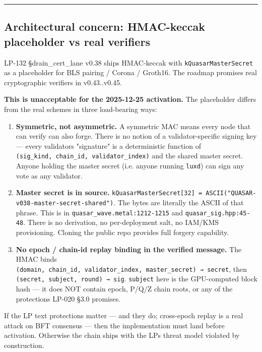 \documentclass[
]{article}
\providecommand{\tightlist}{%
  \setlength{\itemsep}{0pt}\setlength{\parskip}{0pt}}
\begin{document}
\begin{center}\rule{0.5\linewidth}{0.5pt}\end{center}

\subsection{Architectural concern: HMAC-keccak placeholder vs real
verifiers}\label{architectural-concern-hmac-keccak-placeholder-vs-real-verifiers}

LP-132 §drain\_cert\_lane v0.38 ships HMAC-keccak with
\texttt{kQuasarMasterSecret} as a placeholder for BLS pairing / Corona
/ Groth16. The roadmap promises real cryptographic verifiers in
v0.43..v0.45.

\textbf{This is unacceptable for the 2025-12-25 activation.} The
placeholder differs from the real schemes in three load-bearing ways:

\begin{enumerate}
\def\labelenumi{\arabic{enumi}.}
\tightlist
\item
  \textbf{Symmetric, not asymmetric.} A symmetric MAC means every node
  that can verify can also forge. There is no notion of a
  validator-specific signing key --- every validator\textquotesingle s
  "signature" is a deterministic function of
  \texttt{(sig\_kind,\ chain\_id,\ validator\_index)} and the shared
  master secret. Anyone holding the master secret (i.e. anyone running
  \texttt{luxd}) can sign any vote as any validator.
\item
  \textbf{Master secret is in source.}
  \texttt{kQuasarMasterSecret{[}32{]}\ =\ ASCII("QUASAR-v038-master-secret-shared")}.
  The bytes are literally the ASCII of that phrase. This is in
  \texttt{quasar\_wave.metal:1212-1215} and
  \texttt{quasar\_sig.hpp:45-48}. There is no derivation, no
  per-deployment salt, no IAM/KMS provisioning. Cloning the public repo
  provides full forgery capability.
\item
  \textbf{No epoch / chain-id replay binding in the verified message.}
  The HMAC binds
  \texttt{(domain,\ chain\_id,\ validator\_index,\ master\_secret)\ →\ secret},
  then \texttt{(secret,\ subject,\ round)\ →\ sig}. \texttt{subject}
  here is the GPU-computed block hash --- it does NOT contain epoch,
  P/Q/Z chain roots, or any of the protections LP-020 §3.0 promises.
\end{enumerate}

If the LP text protections matter --- and they do; cross-epoch replay is
a real attack on BFT consensus --- then the implementation must land
before activation. Otherwise the chain ships with the
LP\textquotesingle s threat model violated by construction.
\end{document}
